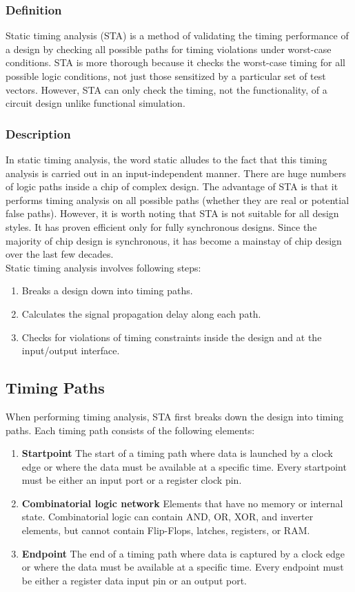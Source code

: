 \subsubsection{Definition}
Static timing analysis (STA) is a method of validating the timing performance of a design by checking all possible paths for timing violations under worst-case conditions. STA is more thorough because it checks the worst-case timing for all possible logic conditions, not just those sensitized by a particular set of test vectors. However, STA can only check the timing, not the functionality, of a circuit design unlike functional simulation.

\subsubsection{Description} 
In static timing analysis, the word static alludes to the fact that this timing analysis is carried out in an input-independent manner. There are huge numbers of logic paths inside a chip of complex design. The advantage of STA is that it performs timing analysis on all possible paths (whether they are real or potential false paths). However, it is worth noting that STA is not suitable for all design styles. It has proven efficient only for fully synchronous designs. Since the majority of chip design is synchronous, it has become a mainstay of chip design over the last few decades.\\
Static timing analysis involves following steps: 
\begin{enumerate}
    \item Breaks a design down into timing paths.
    \item Calculates the signal propagation delay along each path.
    \item Checks for violations of timing constraints inside the design and at the input/output interface.
\end{enumerate}

\subsection{Timing Paths}
When performing timing analysis, STA first breaks down the design into timing paths. Each timing path consists of the following elements:
\begin{enumerate}
    \item \textbf{Startpoint} The start of a timing path where data is launched by a clock edge or where the data must be available at a specific time. Every startpoint must be either an input port or a register clock pin.
    \item \textbf{Combinatorial logic network} Elements that have no memory or internal state. Combinatorial logic can contain AND, OR, XOR, and inverter elements, but cannot contain Flip-Flops, latches, registers, or RAM.
    \item \textbf{Endpoint} The end of a timing path where data is captured by a clock edge or where the data must be available at a specific time. Every endpoint must be either a register data input pin or an output port.
\end{enumerate}

